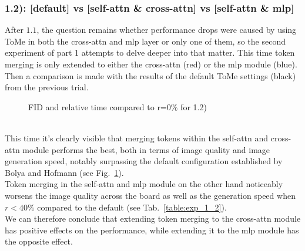 \subsubsection*{1.2): [default] vs [self-attn \& cross-attn] vs [self-attn \& mlp]}
After \(1.1\), the question remains whether performance drops were caused by using ToMe in both the cross-attn and mlp layer or only one of them, so the second experiment of part 1 attempts to delve deeper into that matter. This time token merging is only extended to either the cross-attn (red) or the mlp module (blue). Then a comparison is made with the results of the default ToMe settings (black) from the previous trial.
\begin{figure}[!htb]
    
    
\caption{FID and relative time compared to r=0\% for 1.2)}
\label{fig:exp_1_2}
\end{figure}\\
This time it's clearly visible that merging tokens within the self-attn and cross-attn module performs the best, both in terms of image quality and image generation speed, notably surpassing the default configuration established by Bolya and Hofmann (see Fig.~\ref{fig:exp_1_2}).\\
Token merging in the self-attn and mlp module on the other hand noticeably worsens the image quality across the board as well as the generation speed when $r<40\%$ compared to the default (see Tab.~\ref{table:exp_1_2}).\\
We can therefore conclude that extending token merging to the cross-attn module has positive effects on the performance, while extending it to the mlp module has the opposite effect.



